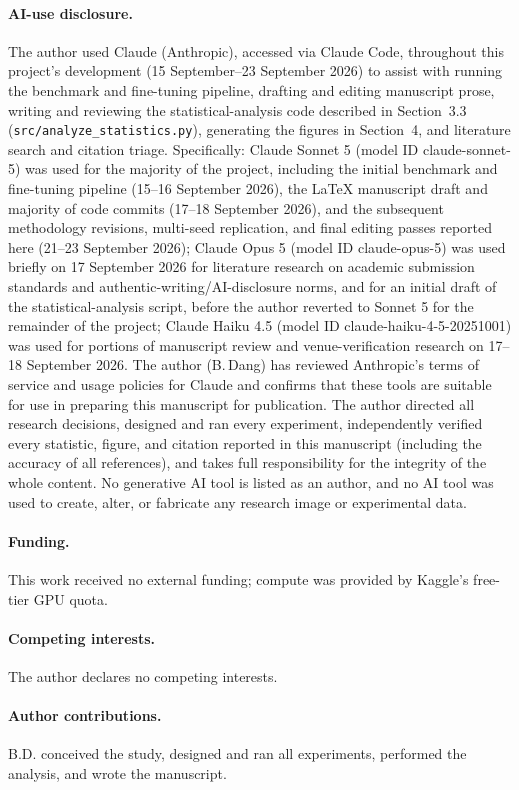 \documentclass[12pt]{article}
\begin{document}
\paragraph{AI-use disclosure.} The author used Claude (Anthropic), accessed via Claude Code,
throughout this project's development (15 September--23 September 2026) to assist with running the
benchmark and fine-tuning pipeline, drafting and editing manuscript prose, writing and reviewing the
statistical-analysis code described in Section~3.3 (\texttt{src/analyze\_\allowbreak statistics.py}),
generating the figures in Section~4, and literature search and citation triage. Specifically: Claude Sonnet
5 (model ID claude-sonnet-5) was used for the majority of the project, including the initial benchmark and
fine-tuning pipeline (15--16 September 2026), the LaTeX manuscript draft and majority of code commits
(17--18 September 2026), and the subsequent methodology revisions, multi-seed replication, and final editing
passes reported here (21--23 September 2026); Claude Opus 5 (model ID claude-opus-5) was used briefly on 17
September 2026 for literature research on academic submission standards and authentic-writing/AI-disclosure
norms, and for an initial draft of the statistical-analysis script, before the author reverted to Sonnet 5
for the remainder of the project; Claude Haiku 4.5 (model ID claude-haiku-4-5-20251001) was used for
portions of manuscript review and venue-verification research on 17--18 September 2026.
The author (B.\,Dang) has reviewed Anthropic's terms of service and usage policies for Claude and confirms
that these tools are suitable for use in preparing this manuscript for publication. The author directed all
research decisions, designed and ran every experiment, independently verified every statistic, figure, and
citation reported in this manuscript (including the accuracy of all references), and takes full
responsibility for the integrity of the whole content. No generative AI tool is listed as an author, and no
AI tool was used to create, alter, or fabricate any research image or experimental data.

\paragraph{Funding.} This work received no external funding; compute was provided by Kaggle's free-tier GPU
quota.

\paragraph{Competing interests.} The author declares no competing interests.

\paragraph{Author contributions.} B.D. conceived the study, designed and ran all experiments, performed
the analysis, and wrote the manuscript.



\end{document}
